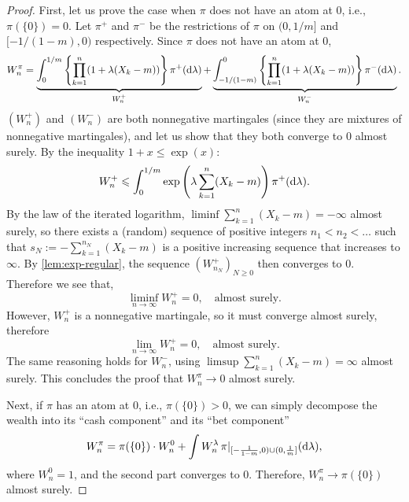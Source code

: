 \begin{proof}
First, let us prove the case when $\pi$ does not have an atom at 0, i.e., $\pi(\{0\}) = 0$.
Let $\pi^+$ and $\pi^-$ be the restrictions of $\pi$ on $(0,1/m]$ and $[-1/(1-m),0 )$ respectively. Since $\pi$ does not have an atom at 0,
    \begin{equation}
    W_n^\pi = \underbrace{\int_0^{1/m} \left\{\prod_{k=1}^n (1 + \lambda(X_k - m))  \right\} \pi^+(\mathrm{d} \lambda)}_{W^+_n} +  \underbrace{\int_{-1/(1-m)}^0 \left\{\prod_{k=1}^n (1 + \lambda(X_k - m))  \right\} \pi^-(\mathrm{d} \lambda)}_{W^-_n}.
\end{equation}
$(W^{+}_n)$ and $(W^-_n)$ are both nonnegative martingales (since they are mixtures of nonnegative martingales), and let us show that they both converge to 0 almost surely. By the inequality $1+x \le \exp(x)$:
\begin{equation}
    W_n^+ \leqslant \int_0^{1/m} \exp\left( \lambda \sum_{k=1}^n(X_k - m)  \right) \pi^+(\mathrm{d} \lambda).
\end{equation}
By the law of the iterated logarithm, $\liminf \sum_{k=1}^n (X_k - m) = -\infty$ almost surely, so
there exists a (random) sequence of positive integers $n_1 < n_2 < \dots$ such that $s_N := -\sum_{k=1}^{n_N}(X_k - m) $ is a positive increasing sequence that increases to $\infty$. By \cref{lem:exp-regular}, the sequence $(W_{n_N}^+)_{N \ge 0}$ then converges to 0. Therefore we see that,
\begin{equation}
    \liminf_{n \to \infty}  W_n^+ = 0, \quad\text{almost surely}.
\end{equation}
However, $W_n^+$ is a nonnegative martingale, so it must converge almost surely, therefore
\begin{equation}
    \lim_{n \to \infty}  W_n^+ = 0, \quad\text{almost surely}.
\end{equation}
The same reasoning holds for $W_n^-$, using $\limsup \sum_{k=1}^n (X_k - m) = \infty$ almost surely. This concludes the proof that $W_n^\pi \to 0$ almost surely.

Next, if $\pi$ has an atom at 0, i.e., $\pi(\{0\}) > 0$, we can simply decompose the wealth into its ``cash component'' and its ``bet component''
\begin{equation}
    W_n^\pi = \pi(\{0\}) \cdot W_n^0 + \int W_n^\lambda \, \pi|_{[-\frac{1}{1-m},0)\cup(0,\frac{1}{m}]}(\mathrm{d} \lambda),
\end{equation}
where $W_n^0 = 1$, and the second part converges to 0. Therefore, $W_n^\pi \to \pi(\{0\})$ almost surely.
\end{proof}


